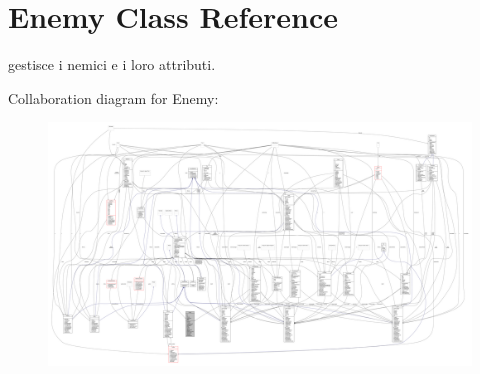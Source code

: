 \hypertarget{classenemies_1_1_enemy}{}\section{Enemy Class Reference}
\label{classenemies_1_1_enemy}


gestisce i nemici e i loro attributi.  




Collaboration diagram for Enemy\+:
\nopagebreak
\begin{figure}[H]
\begin{center}
\leavevmode
\includegraphics[width=350pt]{classenemies_1_1_enemy__coll__graph}
\end{center}
\end{figure}
